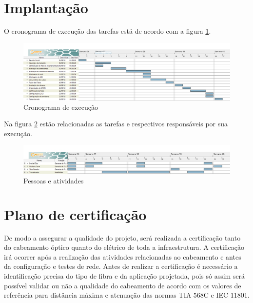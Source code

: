 \documentclass[	DIV=calc,%
							paper=a4,%
							fontsize=12pt,%
							onecolumn]{scrartcl}	 					%
\begin{document}
\section{Implantação}
O cronograma de execução das tarefas está de acordo com a figura \ref{tarefas}.

\begin{figure}
\centering
\includegraphics[width=\textwidth]{tarefas}
\caption{Cronograma de execução}
\label{tarefas}
\end{figure}
Na figura \ref{pessoas} estão relacionadas as tarefas e respectivos responsáveis por sua execução.

\begin{figure}
\centering
\includegraphics[width=\textwidth]{pessoas}
\caption{Pessoas e atividades}
\label{pessoas}
\end{figure}



\section{Plano de certificação}
De modo a assegurar a qualidade do projeto, será realizada a certificação tanto do cabeamento óptico quanto do elétrico de toda a infraestrutura.
A certificação irá ocorrer após a realização das atividades relacionadas ao cabeamento e antes da configuração e testes de rede.
Antes de realizar a certificação é necessário a identificação precisa do tipo de fibra e da aplicação projetada, pois só assim será possível validar ou não a qualidade do cabeamento
de acordo com os valores de referência para distância máxima e atenuação das normas TIA 568C e IEC 11801. 
\end{document}
